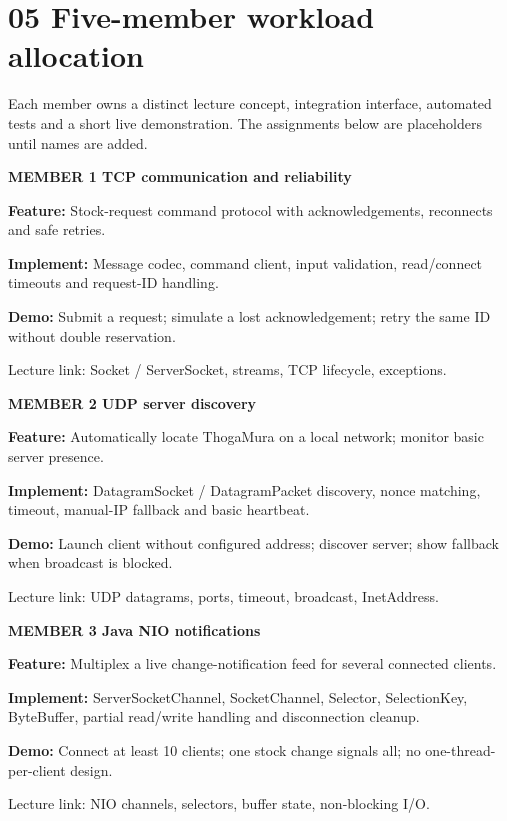 \documentclass[10pt,a4paper]{article}
\newcommand{\smalllabel}[1]{{\color{teal}\bfseries #1}}
\newcommand{\quiet}[1]{{\color{grey}#1}}
\begin{document}
\newpage

\section*{05 \quad Five-member workload allocation}
\quiet{Each member owns a distinct lecture concept, integration interface, automated tests and a short live demonstration. The assignments below are placeholders until names are added.}\par
\vspace{2mm}

\begin{tcolorbox}[colback=light,colframe=line,arc=1.5mm,boxrule=0.6pt]
\smalllabel{MEMBER 1 \quad TCP communication and reliability}\par
\textbf{Feature:} Stock-request command protocol with acknowledgements, reconnects and safe retries.\par
\textbf{Implement:} Message codec, command client, input validation, read/connect timeouts and request-ID handling.\par
\textbf{Demo:} Submit a request; simulate a lost acknowledgement; retry the same ID without double reservation.\par
\quiet{Lecture link: Socket / ServerSocket, streams, TCP lifecycle, exceptions.}
\end{tcolorbox}

\begin{tcolorbox}[colback=light,colframe=line,arc=1.5mm,boxrule=0.6pt]
\smalllabel{MEMBER 2 \quad UDP server discovery}\par
\textbf{Feature:} Automatically locate ThogaMura on a local network; monitor basic server presence.\par
\textbf{Implement:} DatagramSocket / DatagramPacket discovery, nonce matching, timeout, manual-IP fallback and basic heartbeat.\par
\textbf{Demo:} Launch client without configured address; discover server; show fallback when broadcast is blocked.\par
\quiet{Lecture link: UDP datagrams, ports, timeout, broadcast, InetAddress.}
\end{tcolorbox}

\begin{tcolorbox}[colback=light,colframe=line,arc=1.5mm,boxrule=0.6pt]
\smalllabel{MEMBER 3 \quad Java NIO notifications}\par
\textbf{Feature:} Multiplex a live change-notification feed for several connected clients.\par
\textbf{Implement:} ServerSocketChannel, SocketChannel, Selector, SelectionKey, ByteBuffer, partial read/write handling and disconnection cleanup.\par
\textbf{Demo:} Connect at least 10 clients; one stock change signals all; no one-thread-per-client design.\par
\quiet{Lecture link: NIO channels, selectors, buffer state, non-blocking I/O.}
\end{tcolorbox}
\end{document}
